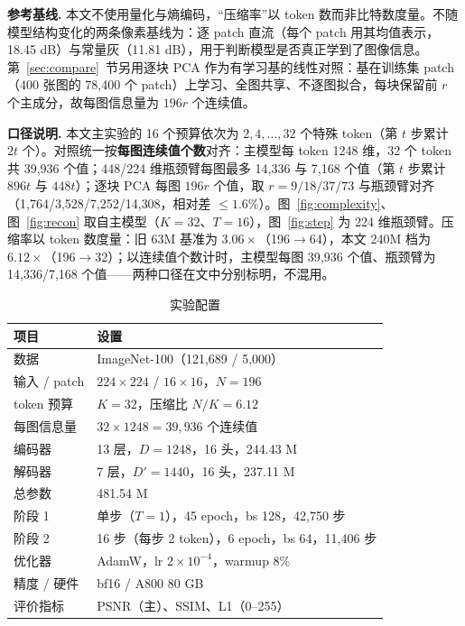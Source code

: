 \textbf{参考基线.} 本文不使用量化与熵编码，“压缩率”以 token 数而非比特数度量。不随模型结构变化的两条像素基线为：逐 patch 直流（每个 patch 用其均值表示，18.45 dB）与常量灰（11.81 dB），用于判断模型是否真正学到了图像信息。第~\ref{sec:compare}~节另用逐块 PCA 作为有学习基的线性对照：基在训练集 patch（400 张图的 78{,}400 个 patch）上学习、全图共享、不逐图拟合，每块保留前 $r$ 个主成分，故每图信息量为 $196r$ 个连续值。

\textbf{口径说明.} 本文主实验的 16 个预算依次为 $2,4,\dots,32$ 个特殊 token（第 $t$ 步累计 $2t$ 个）。对照统一按\textbf{每图连续值个数}对齐：主模型每 token 1248 维，32 个 token 共 39{,}936 个值；448/224 维瓶颈臂每图最多 14{,}336 与 7{,}168 个值（第 $t$ 步累计 $896t$ 与 $448t$）；逐块 PCA 每图 $196r$ 个值，取 $r=9/18/37/73$ 与瓶颈臂对齐（1{,}764/3{,}528/7{,}252/14{,}308，相对差 $\le1.6\%$）。图~\ref{fig:complexity}、图~\ref{fig:recon} 取自主模型（$K=32$、$T=16$），图~\ref{fig:step} 为 224 维瓶颈臂。压缩率以 token 数度量：旧 63M 基准为 $3.06\times$（196$\to$64），本文 240M 档为 $6.12\times$（196$\to$32）；以连续值个数计时，主模型每图 39{,}936 个值、瓶颈臂为 14{,}336/7{,}168 个值——两种口径在文中分别标明，不混用。

\begin{table}[htbp]
\centering\footnotesize\setlength{\tabcolsep}{3pt}
\caption{实验配置}
\label{tab:config}
\begin{tabular}{ll}
\toprule
项目 & 设置 \\
\midrule
数据 & ImageNet-100（121,689 / 5,000） \\
输入 / patch & $224\times224$ / $16\times16$，$N=196$ \\
token 预算 & $K=32$，压缩比 $N/K=6.12$ \\
每图信息量 & $32\times1248=39{,}936$ 个连续值 \\
编码器 & 13 层，$D=1248$，16 头，244.43 M \\
解码器 & 7 层，$D'=1440$，16 头，237.11 M \\
总参数 & 481.54 M \\
阶段 1 & 单步（$T=1$），45 epoch，bs 128，42,750 步 \\
阶段 2 & 16 步（每步 2 token），6 epoch，bs 64，11,406 步 \\
优化器 & AdamW，lr $2\times10^{-4}$，warmup 8\% \\
精度 / 硬件 & bf16 / A800 80 GB \\
评价指标 & PSNR（主）、SSIM、L1（0--255） \\
\bottomrule
\end{tabular}
\end{table}

